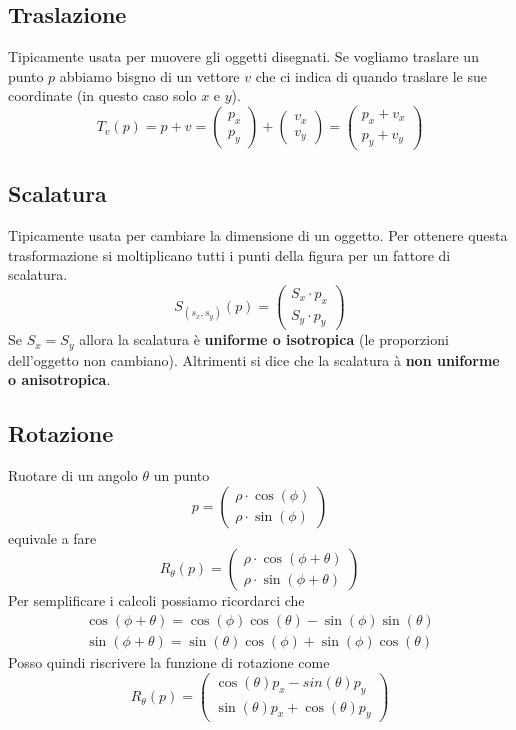 \subsection{Traslazione}
Tipicamente usata per muovere gli oggetti disegnati. Se vogliamo traslare un punto $p$ abbiamo
bisgno di un vettore $v$ che ci indica di quando traslare le sue coordinate (in questo caso
solo $x$ e $y$).
\[
	T_v(p) = p + v =
	\begin{pmatrix}
		p_x \\ p_y
	\end{pmatrix} +
	\begin{pmatrix}
		v_x \\ v_y
	\end{pmatrix} =
	\begin{pmatrix}
		p_x + v_x \\ p_y + v_y
	\end{pmatrix}
\]

\subsection{Scalatura}
Tipicamente usata per cambiare la dimensione di un oggetto. Per ottenere questa trasformazione
si moltiplicano tutti i punti della figura per un fattore di scalatura.
\[
	S_{(s_x, s_y)}(p) =
	\begin{pmatrix}
		S_x \cdot p_x \\
		S_y \cdot p_y
	\end{pmatrix}
\]
Se $S_x = S_y$ allora la scalatura \`e \textbf{uniforme o isotropica} (le proporzioni
dell'oggetto non cambiano). Altrimenti si dice che la scalatura \`a
\textbf{non uniforme o anisotropica}.

\subsection{Rotazione}
Ruotare di un angolo $\theta$ un punto
\[
	p = \begin{pmatrix}
		\rho \cdot \cos(\phi) \\
		\rho \cdot \sin(\phi)
	\end{pmatrix}\]
equivale a fare
\[
	R_\theta(p) =
	\begin{pmatrix}
		\rho \cdot \cos(\phi + \theta) \\
		\rho \cdot \sin(\phi + \theta)
	\end{pmatrix}
\]
Per semplificare i calcoli possiamo ricordarci che
\begin{gather*}
	\cos(\phi + \theta) = \cos(\phi) \cos(\theta) - \sin(\phi) \sin(\theta) \\
	\sin(\phi + \theta) = \sin(\theta) \cos(\phi) + \sin(\phi) \cos(\theta)
\end{gather*}
Posso quindi riscrivere la funzione di rotazione come
\[
	R_\theta(p) =
	\begin{pmatrix}
		\cos(\theta)p_x - sin(\theta)p_y \\
		\sin(\theta)p_x + \cos(\theta)p_y
	\end{pmatrix}
\]

